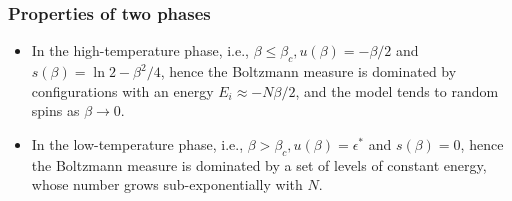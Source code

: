 \documentclass[letterpaper,english,10pt]{article}
\begin{document}
\subsubsection{Properties of two phases}
\begin{itemize}
\item In the high-temperature phase, i.e., $\beta \le \beta_c, u(\beta) = -\beta/2$ and $s(\beta) = \ln2- \beta^2/4$, 
hence the Boltzmann measure is dominated by configurations with an energy $E_i \approx -N\beta/2$, 
and the model tends to random spins as $\beta \to 0$. 

\item In the low-temperature phase, i.e., $\beta > \beta_c, u(\beta) = \epsilon^\ast$ and $s(\beta) = 0$, hence the Boltzmann measure is dominated by a set of levels of constant energy, whose number grows sub-exponentially with $N$. 
\end{itemize}
\end{document}
